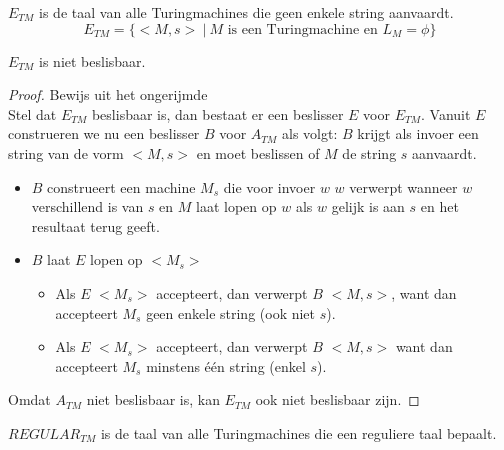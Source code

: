 \documentclass[main.tex]{subfiles}
\begin{document}
\begin{de}
  \label{de:e-tm}
  $E_{TM}$ is de taal van alle Turingmachines die geen enkele string aanvaardt.
  \[ E_{TM} = \{ <M,s>\ |\ M \text{ is een Turingmachine en } L_{M} = \phi \} \]
\end{de}

\begin{st}
  \label{st:e-tm-niet-besl}
  $E_{TM}$ is niet beslisbaar.

  \begin{proof}
    Bewijs uit het ongerijmde\\
    Stel dat $E_{TM}$ beslisbaar is, dan bestaat er een beslisser $E$ voor $E_{TM}$.
    Vanuit $E$ construeren we nu een beslisser $B$ voor $A_{TM}$ als volgt:
    $B$ krijgt als invoer een string van de vorm $<M,s>$ en moet beslissen of $M$ de string $s$ aanvaardt.
    \begin{itemize}
    \item $B$ construeert een machine $M_{s}$ die voor invoer $w$ $w$ verwerpt wanneer $w$ verschillend is van $s$ en $M$ laat lopen op $w$ als $w$ gelijk is aan $s$ en het resultaat terug geeft.
    \item $B$ laat $E$ lopen op $<M_{s}>$
      \begin{itemize}
      \item Als $E$ $<M_{s}>$ accepteert, dan verwerpt $B$ $<M,s>$, want dan accepteert $M_{s}$ geen enkele string (ook niet $s$).
      \item Als $E$ $<M_{s}>$ accepteert, dan verwerpt $B$ $<M,s>$ want dan accepteert $M_{s}$ minstens \'e\'en string (enkel $s$).
      \end{itemize}
    \end{itemize}
    Omdat $A_{TM}$ niet beslisbaar is, kan $E_{TM}$ ook niet beslisbaar zijn.
  \end{proof}
\end{st}

\begin{de}
  \label{de:regular-tm}
  $REGULAR_{TM}$ is de taal van alle Turingmachines die een reguliere taal bepaalt.
\end{de}
\end{document}
